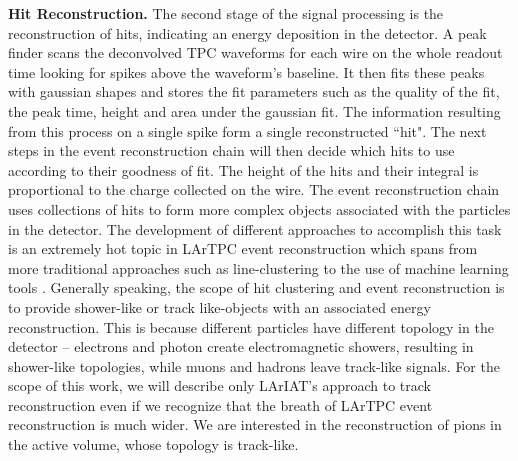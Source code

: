 \documentclass[aps,prl,twocolumn,showpacs,superscriptaddress,groupedaddress]{revtex4}  %
\begin{document}
\textbf{Hit Reconstruction.} The second stage of the signal processing is the reconstruction of hits, indicating an energy deposition in the detector.  A peak finder scans the deconvolved TPC waveforms for each wire on the whole readout time looking for spikes  above  the waveform's baseline. It then fits these peaks with gaussian shapes and stores the fit parameters such as the quality of the fit, the peak time, height and area under the gaussian fit. The information resulting from this process on a single spike form a single reconstructed ``hit".%
The next steps in the event reconstruction chain will then decide which hits to use according to their goodness of fit. %
The height of the hits and their integral is proportional to the charge collected on the wire.
The event reconstruction chain uses collections of hits to form more complex objects associated with the particles in the detector. The development of different approaches to accomplish this task is an extremely hot topic in LArTPC event reconstruction which spans from more traditional approaches such as line-clustering  \cite{Barker2011} to the use of machine learning tools \cite{1748-0221-12-03-P03011}. Generally speaking, the scope of hit clustering and event reconstruction is to provide shower-like or track like-objects with an associated energy reconstruction. This is because different particles have different topology in the detector -- electrons and photon create electromagnetic showers,  resulting in shower-like topologies, while muons and hadrons  leave track-like signals.  For the scope of this work, we will describe only LArIAT's approach to track reconstruction even if we recognize that the breath of LArTPC event reconstruction is much wider. We are interested in the reconstruction of pions in the active volume, whose topology is track-like.\\
\end{document}
